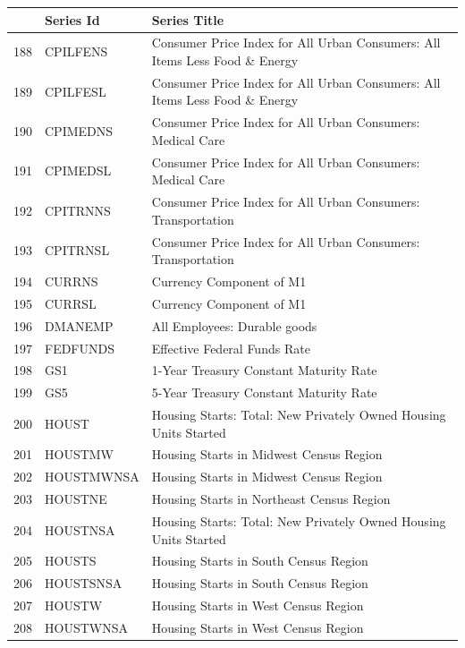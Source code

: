 \documentclass[12pt]{article}
\begin{document}
\begin{table}
\centering
\begin{tabular}{rp{5cm}p{11cm}}
	& \textbf{Series Id} & \textbf{Series Title} \\
  \hline
  \hline
	188 & CPILFENS & Consumer Price Index for All Urban Consumers: All Items Less Food \& Energy \\
  \hline
	189 & CPILFESL & Consumer Price Index for All Urban Consumers: All Items Less Food \& Energy \\
  \hline
	190 & CPIMEDNS & Consumer Price Index for All Urban Consumers: Medical Care \\
  \hline
	191 & CPIMEDSL & Consumer Price Index for All Urban Consumers: Medical Care \\
  \hline
	192 & CPITRNNS & Consumer Price Index for All Urban Consumers: Transportation \\
  \hline
	193 & CPITRNSL & Consumer Price Index for All Urban Consumers: Transportation \\
  \hline
	194 & CURRNS & Currency Component of M1 \\
  \hline
	195 & CURRSL & Currency Component of M1 \\
  \hline
	196 & DMANEMP & All Employees: Durable goods \\
  \hline
	197 & FEDFUNDS & Effective Federal Funds Rate \\
  \hline
	198 & GS1 & 1-Year Treasury Constant Maturity Rate \\
  \hline
	199 & GS5 & 5-Year Treasury Constant Maturity Rate \\
  \hline
	200 & HOUST & Housing Starts: Total: New Privately Owned Housing Units Started \\
  \hline
	201 & HOUSTMW & Housing Starts in Midwest Census Region \\
  \hline
	202 & HOUSTMWNSA & Housing Starts in Midwest Census Region \\
  \hline
	203 & HOUSTNE & Housing Starts in Northeast Census Region \\
  \hline
	204 & HOUSTNSA & Housing Starts: Total: New Privately Owned Housing Units Started \\
  \hline
	205 & HOUSTS & Housing Starts in South Census Region \\
  \hline
	206 & HOUSTSNSA & Housing Starts in South Census Region \\
  \hline
	207 & HOUSTW & Housing Starts in West Census Region \\
  \hline
	208 & HOUSTWNSA & Housing Starts in West Census Region \\

\end{tabular}
\end{table}
\end{document}
